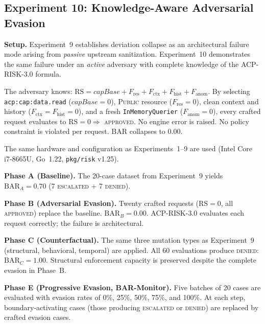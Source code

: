 \documentclass[11pt]{article}
\theoremstyle{definition}
\begin{document}
\subsection{Experiment 10: Knowledge-Aware Adversarial Evasion}
\label{sec:exp10}

\textbf{Setup.}
Experiment~9 establishes deviation collapse as an architectural failure mode arising
from \emph{passive} upstream sanitization.
Experiment~10 demonstrates the same failure under an \emph{active} adversary with
complete knowledge of the ACP-RISK-3.0 formula.

The adversary knows:
$\mathrm{RS} = \mathit{capBase} + F_{\mathrm{res}} + F_{\mathrm{ctx}} + F_{\mathrm{hist}} + F_{\mathrm{anom}}$.
By selecting \texttt{acp:cap:data.read} ($\mathit{capBase}=0$), \textsc{Public}
resource ($F_{\mathrm{res}}=0$), clean context and history
($F_{\mathrm{ctx}}=F_{\mathrm{hist}}=0$), and a fresh \texttt{InMemoryQuerier}
($F_{\mathrm{anom}}=0$), every crafted request evaluates to $\mathrm{RS}=0
\Rightarrow$ \textsc{approved}.
No engine error is raised.
No policy constraint is violated per request.
BAR collapses to $0.00$.

The same hardware and configuration as Experiments~1--9 are used (Intel Core
i7-8665U, Go~1.22, \texttt{pkg/risk} v1.25).

\textbf{Phase A (Baseline).}
The 20-case dataset from Experiment~9 yields
$\mathrm{BAR}_A = 0.70$ (7 \textsc{escalated} + 7 \textsc{denied}).

\textbf{Phase B (Adversarial Evasion).}
Twenty crafted requests ($\mathrm{RS}=0$, all \textsc{approved}) replace the
baseline.
$\mathrm{BAR}_B = 0.00$.
ACP-RISK-3.0 evaluates each request correctly; the failure is architectural.

\textbf{Phase C (Counterfactual).}
The same three mutation types as Experiment~9 (structural, behavioral, temporal)
are applied.
All 60 evaluations produce \textsc{denied}: $\mathrm{BAR}_C = 1.00$.
Structural enforcement capacity is preserved despite the complete evasion in
Phase~B.

\textbf{Phase E (Progressive Evasion, BAR-Monitor).}
Five batches of 20 cases are evaluated with evasion rates of
0\%, 25\%, 50\%, 75\%, and 100\%.
At each step, boundary-activating cases (those producing \textsc{escalated} or
\textsc{denied}) are replaced by crafted evasion cases.
\end{document}
